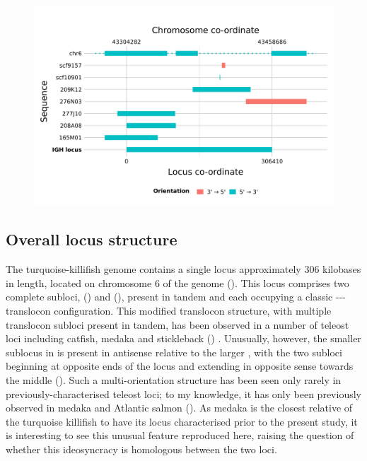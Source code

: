 \begin{figure}
\centering
\includegraphics[width=\textwidth]{_Figures/png/nfu-locus-aln}
\label{fig:nfu-locus-aln}
\end{figure}

\subsection{Overall locus structure}
\label{sec:nfu-locus-structure}
	
The turquoise-killifish genome contains a single \igh{} locus approximately 306 kilobases in length, located on chromosome 6 of the \Nfu genome (). This locus comprises two complete subloci,  () and  (), present in tandem and each occupying a classic {\vh-\dh-\jh-\ch} translocon configuration. This modified translocon structure, with multiple translocon subloci present in tandem, has been observed in a number of teleost \igh{} loci including catfish, medaka and stickleback () \parencite{fillatreau2013astonishing}. Unusually, however, the smaller  sublocus in \nfu \igh{} is present in antisense relative to the larger , with the two subloci beginning at opposite ends of the locus and extending in opposite sense towards the middle (). Such a multi-orientation structure has been seen only rarely in previously-characterised teleost \igh{} loci; to my knowledge, it has only been previously observed in medaka \parencite{magadan2011medaka} and Atlantic salmon (). As medaka is the closest relative of the turquoise killifish to have its locus characterised prior to the present study, it is interesting to see this unusual feature reproduced here, raising the question of whether this ideosyncracy is homologous between the two loci.
	
